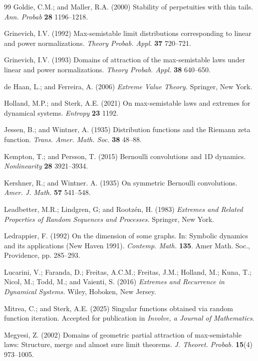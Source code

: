 \documentclass[12pt]{amsart}
\theoremstyle{definition}
\theoremstyle{remark}
\numberwithin{equation}{section}
\begin{document}
\begin{thebibliography}{99}
 Goldie, C.M.; and Maller, R.A. (2000) Stability of perpetuities with thin tails. {\it Ann. Probab} {\bf 28} 1196--1218.

 Grinevich, I.V. (1992) Max-semistable limit distributions corresponding to linear and power normalizations. {\it Theory Probab. Appl.} {\bf 37} 720--721.

 Grinevich, I.V. (1993) Domains of attraction of the max-semistable laws under linear and power normalizations. {\it Theory Probab. Appl.} {\bf 38} 640--650.

 de Haan, L.; and Ferreira, A. (2006) {\it Extreme Value Theory.} Springer, New York.

 Holland, M.P.; and Sterk, A.E. (2021) On max-semistable laws and extremes for dynamical systems. {\it Entropy} {\bf 23} 1192.

 Jessen, B.; and Wintner, A. (1935) Distribution functions and the Riemann zeta function. {\it Trans. Amer. Math. Soc.} {\bf 38} 48--88.

 Kempton, T.; and Persson, T. (2015) Bernoulli convolutions and 1D dynamics. {\it Nonlinearity} {\bf 28} 3921--3934.

 Kershner, R.; and Wintner. A. (1935) On symmetric Bernoulli convolutions. {\it Amer. J. Math.} {\bf 57} 541--548.

 Leadbetter, M.R.; Lindgren, G; and Rootz\'en, H. (1983) {\it Extremes and Related Properties of Random Sequences and Processes.} Springer, New York.

 Ledrappier, F. (1992) On the dimension of some graphs. In: Symbolic dynamics and its applications (New Haven 1991). {\it Contemp. Math.} {\bf 135}. Amer Math. Soc., Providence, pp. 285--293.

 Lucarini, V.; Faranda, D.; Freitas, A.C.M.; Freitas, J.M.; Holland, M.; Kuna, T.; Nicol, M.; Todd, M.; and Vaienti, S. (2016) {\it Extremes and Recurrence in Dynamical Systems.} Wiley, Hoboken, New Jersey.

 Mitrea, C.; and Sterk, A.E. (2025) Singular functions obtained via random function iteration. Accepted for publication in {\it Involve, a Journal of Mathematics}.

 Megyesi, Z. (2002) Domains of geometric partial attraction of max-semistable laws: Structure, merge and almost sure limit theorems. {\it J. Theoret. Probab.} {\bf 15}(4) 973--1005.


\end{thebibliography}
\end{document}
